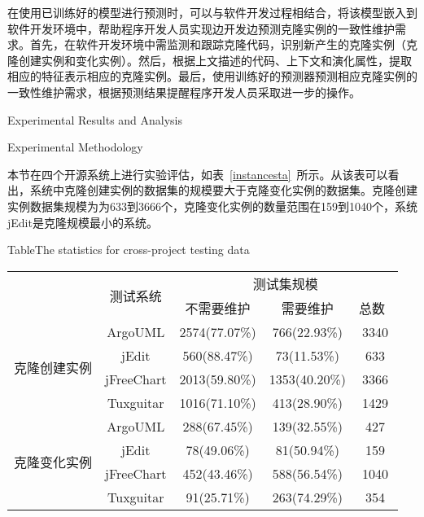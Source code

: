 在使用已训练好的模型进行预测时，可以与软件开发过程相结合，将该模型嵌入到软件开发环境中，帮助程序开发人员实现边开发边预测克隆实例的一致性维护需求。首先，在软件开发环境中需监测和跟踪克隆代码，识别新产生的克隆实例（克隆创建实例和变化实例）。然后，根据上文描述的代码、上下文和演化属性，提取相应的特征表示相应的克隆实例。最后，使用训练好的预测器预测相应克隆实例的一致性维护需求，根据预测结果提醒程序开发人员采取进一步的操作。

{Experimental Results and Analysis}


{Experimental Methodology}

本节在四个开源系统上进行实验评估，如表~\ref{instancesta}~所示。从该表可以看出，系统中克隆创建实例的数据集的规模要大于克隆变化实例的数据集。克隆创建实例数据集规模为为633到3666个，克隆变化实例的数量范围在159到1040个，系统jEdit是克隆规模最小的系统。


\begin{table}[htbp]
{Table$\!$}{The statistics for cross-project testing data}
\vspace{0.5em}
\centering
\wuhao
\begin{tabular}{ccccc}
\toprule[1.5pt]
~\multirow{2}{*}{类型}&\multirow{2}{*}{测试系统}&\multicolumn{3}{c}{测试集规模}\\
\cline{3-5}
~&~&{不需要维护}&{需要维护}&{总数}~\\
\midrule[1pt]
\multirow{4}{*}{克隆创建实例}
&ArgoUML&	2574(77.07\%)&	766(22.93\%)&	3340\\
&jEdit&560(88.47\%)&	73(11.53\%)&	633\\
&jFreeChart&	2013(59.80\%)&	1353(40.20\%)&	3366\\
&Tuxguitar&	1016(71.10\%)&	413(28.90\%)&	1429\\
\hline
\multirow{4}{*}{克隆变化实例}
&ArgoUML&288(67.45\%)&139(32.55\%)&427\\
&jEdit&78(49.06\%)&81(50.94\%)&159\\
&jFreeChart&452(43.46\%)&588(56.54\%)&1040\\
&Tuxguitar&91(25.71\%)&263(74.29\%)&354\\
\bottomrule[1.5pt]
\end{tabular}
\end{table}

